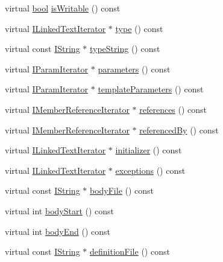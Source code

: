 \begin{DoxyCompactItemize}
virtual \hyperlink{qglobal_8h_a1062901a7428fdd9c7f180f5e01ea056}{bool} \hyperlink{class_member_handler_a5857036c13b54d212f9ddf0cc9402ce0}{is\+Writable} () const 
\item 
virtual \hyperlink{class_i_linked_text_iterator}{I\+Linked\+Text\+Iterator} $\ast$ \hyperlink{class_member_handler_a0e0787ea03dd06218958731ea1bfb373}{type} () const 
\item 
virtual const \hyperlink{class_i_string}{I\+String} $\ast$ \hyperlink{class_member_handler_a193fbb3515d1a06b1b358496ebff90d5}{type\+String} () const 
\item 
virtual \hyperlink{class_i_param_iterator}{I\+Param\+Iterator} $\ast$ \hyperlink{class_member_handler_ad01af0b592295156002ffaf6ec186df2}{parameters} () const 
\item 
virtual \hyperlink{class_i_param_iterator}{I\+Param\+Iterator} $\ast$ \hyperlink{class_member_handler_a1daeb4fa13c34188a3ffcc1f968a0871}{template\+Parameters} () const 
\item 
virtual \hyperlink{class_i_member_reference_iterator}{I\+Member\+Reference\+Iterator} $\ast$ \hyperlink{class_member_handler_a6ba95c9a261d37f25c6be3aac2abdf81}{references} () const 
\item 
virtual \hyperlink{class_i_member_reference_iterator}{I\+Member\+Reference\+Iterator} $\ast$ \hyperlink{class_member_handler_a1a7ab5ccde92e91cb1872aff449ee883}{referenced\+By} () const 
\item 
virtual \hyperlink{class_i_linked_text_iterator}{I\+Linked\+Text\+Iterator} $\ast$ \hyperlink{class_member_handler_a2aef685818191c41babb12ce0b017b26}{initializer} () const 
\item 
virtual \hyperlink{class_i_linked_text_iterator}{I\+Linked\+Text\+Iterator} $\ast$ \hyperlink{class_member_handler_a14ef03f35fbe591d8b584d6a1905389c}{exceptions} () const 
\item 
virtual const \hyperlink{class_i_string}{I\+String} $\ast$ \hyperlink{class_member_handler_aae23403a44ea871ee789c48aca7ec921}{body\+File} () const 
\item 
virtual int \hyperlink{class_member_handler_afc16af093bc3788d5c679496964b4bc9}{body\+Start} () const 
\item 
virtual int \hyperlink{class_member_handler_a8fb907d06fcc1fdd49fdff338c3360bb}{body\+End} () const 
\item 
virtual const \hyperlink{class_i_string}{I\+String} $\ast$ \hyperlink{class_member_handler_a3c2d26205ef1d584a2b4d515e8487c3a}{definition\+File} () const 
\item 

\end{DoxyCompactItemize}
